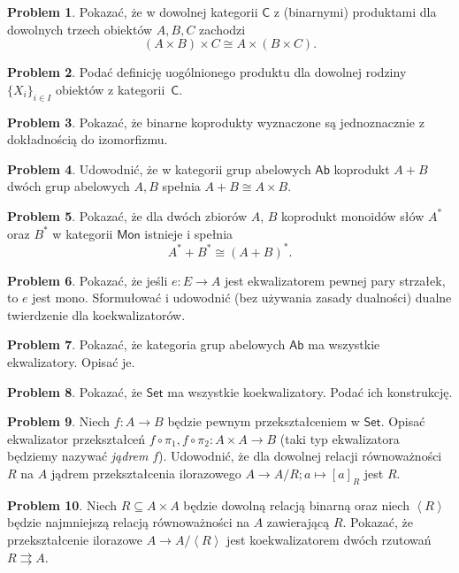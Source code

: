 \documentclass[10pt]{amsart}
\theoremstyle{plain}
\theoremstyle{definition}
\newtheorem{problem}{Problem}
\numberwithin{equation}{section}
\begin{document}
\begin{problem}
Pokazać, że w dowolnej kategorii $\mathsf{C}$ z (binarnymi) produktami dla dowolnych trzech obiektów $A,B,C$ zachodzi
$$
(A\times B)\times C \cong A\times (B\times C).
$$
\end{problem}

\begin{problem}
Podać definicję uogólnionego produktu dla dowolnej rodziny $\{X_i\}_{i\in I}$ obiektów z kategorii~$\mathsf{C}$. 
\end{problem}

\begin{problem}
Pokazać, że binarne koprodukty wyznaczone są jednoznacznie z dokładnością do izomorfizmu.
\end{problem}

\begin{problem}
Udowodnić, że w kategorii grup abelowych $\mathsf{Ab}$ koprodukt $A+B$ dwóch grup abelowych $A,B$ spełnia $A+B \cong A\times B$.  
\end{problem}

\begin{problem}
Pokazać, że dla dwóch zbiorów $A$, $B$ koprodukt monoidów słów $A^\ast$ oraz $B^\ast$ w kategorii $\mathsf{Mon}$ istnieje i spełnia 
$$
A^\ast + B^\ast \cong (A+B)^\ast.
$$
\end{problem}

\begin{problem}
Pokazać, że jeśli $e:E\to A$ jest ekwalizatorem pewnej pary strzałek, to $e$ jest mono. Sformułować i udowodnić (bez używania zasady dualności) dualne twierdzenie dla koekwalizatorów. 
\end{problem}

\begin{problem}
Pokazać, że kategoria grup abelowych $\mathsf{Ab}$ ma wszystkie ekwalizatory. Opisać je. 
\end{problem}

\begin{problem}
Pokazać, że $\mathsf{Set}$ ma wszystkie koekwalizatory. Podać ich konstrukcję.
\end{problem}

\begin{problem}
Niech $f:A\to B$ będzie pewnym przekształceniem w $\mathsf{Set}$. Opisać ekwalizator przekształceń $f\circ \pi_1, f\circ \pi_2:A\times A\to B$ (taki typ ekwalizatora będziemy nazywać \emph{jądrem} $f$). Udowodnić, że dla dowolnej relacji równoważności $R$ na $A$ jądrem  przekształcenia ilorazowego $A\to A/R; a\mapsto [a]_R$ jest $R$.
\end{problem}

\begin{problem}
Niech $R\subseteq A\times A$ będzie dowolną relacją binarną oraz niech $\left < R\right >$ będzie najmniejszą relacją równoważności na $A$ zawierającą $R$. Pokazać, że przekształcenie ilorazowe $A\to A/\left < R \right >$ jest koekwalizatorem dwóch rzutowań $R\rightrightarrows A$. 
\end{problem}
\end{document}
